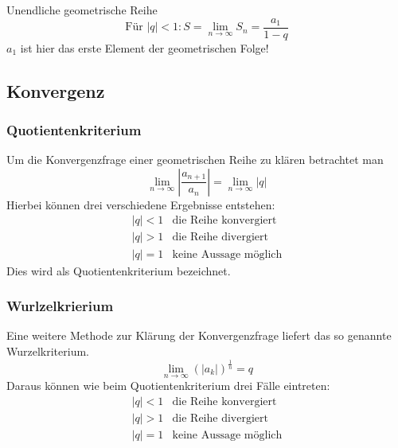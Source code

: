 Unendliche geometrische Reihe
\[ \boxed{\text{Für } |q| < 1: S = \lim_{n \rightarrow \infty} S_n = \frac{a_1}{1 - q}} \] 
$a_1$ ist hier das erste Element der geometrischen Folge!

\subsection{Konvergenz}

\subsubsection*{Quotientenkriterium}
Um die Konvergenzfrage einer geometrischen Reihe zu klären betrachtet man
\[\boxed{ \lim\limits_{n \rightarrow \infty} \left| \frac{a_{n+1}}{a_n} \right| = \lim\limits_{n \rightarrow \infty} \left| q \right|} \]
Hierbei können drei verschiedene Ergebnisse entstehen:
\[ \boxed{\begin{array}{ll}
|q| < 1 & \text{die Reihe konvergiert} \\
|q| > 1 & \text{die Reihe divergiert} \\
|q| = 1 & \text{keine Aussage möglich}
\end{array}} \]
Dies wird als Quotientenkriterium bezeichnet.

\subsubsection*{Wurlzelkrierium}
Eine weitere Methode zur Klärung der Konvergenzfrage liefert das so genannte Wurzelkriterium.
\[\boxed{ \lim\limits_{n \rightarrow \infty} \left( |a_k| \right)^{\frac{1}{n}} = q }\]
Daraus können wie beim Quotientenkriterium drei Fälle eintreten:
\[ \boxed{\begin{array}{ll}
|q| < 1 & \text{die Reihe konvergiert} \\
|q| > 1 & \text{die Reihe divergiert} \\
|q| = 1 & \text{keine Aussage möglich} 
\end{array}} \]


\ifti
